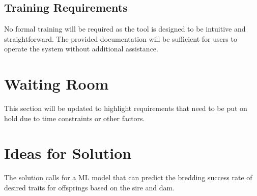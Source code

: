 \documentclass[12pt]{article}
\begin{document}
\subsection{Training Requirements}
No formal training will be required as the tool is designed to be intuitive and
straightforward. The provided documentation will be sufficient for users to
operate the system without additional assistance.

\section{Waiting Room}
This section will be updated to highlight requirements that need to be put on
hold due to time constraints or other factors.

\section{Ideas for Solution}

The solution calls for a ML model that can predict the bredding success rate of 
desired traits for offsprings based on the sire and dam.
\end{document}
